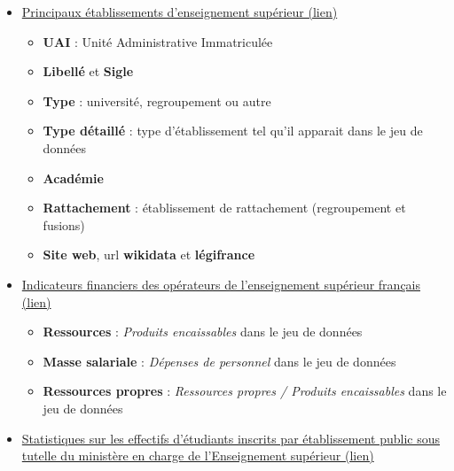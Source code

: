 \documentclass[12pt,french,]{article}
\providecommand{\tightlist}{%
  \setlength{\itemsep}{0pt}\setlength{\parskip}{0pt}}
\begin{document}
\begin{itemize}
\tightlist
\item
  \href{https://data.enseignementsup-recherche.gouv.fr/explore/dataset/fr-esr-principaux-etablissements-enseignement-superieur/}{Principaux
  établissements d'enseignement supérieur (lien)}

  \begin{itemize}
  \tightlist
  \item
    \textbf{UAI} : Unité Administrative Immatriculée
  \item
    \textbf{Libellé} et \textbf{Sigle}
  \item
    \textbf{Type} : université, regroupement ou autre
  \item
    \textbf{Type détaillé} : type d'établissement tel qu'il apparait
    dans le jeu de données
  \item
    \textbf{Académie}
  \item
    \textbf{Rattachement} : établissement de rattachement (regroupement
    et fusions)
  \item
    \textbf{Site web}, url \textbf{wikidata} et \textbf{légifrance}
  \end{itemize}
\item
  \href{https://data.enseignementsup-recherche.gouv.fr/explore/dataset/fr-esr-operateurs-indicateurs-financiers/}{Indicateurs
  financiers des opérateurs de l'enseignement supérieur français (lien)}

  \begin{itemize}
  \tightlist
  \item
    \textbf{Ressources} : \emph{Produits encaissables} dans le jeu de
    données
  \item
    \textbf{Masse salariale} : \emph{Dépenses de personnel} dans le jeu
    de données
  \item
    \textbf{Ressources propres} : \emph{Ressources propres / Produits
    encaissables} dans le jeu de données
  \end{itemize}
\item
  \href{https://data.enseignementsup-recherche.gouv.fr/explore/dataset/fr-esr-statistiques-sur-les-effectifs-d-etudiants-inscrits-par-etablissement/}{Statistiques
  sur les effectifs d'étudiants inscrits par établissement public sous
  tutelle du ministère en charge de l'Enseignement supérieur (lien)}


\end{itemize}
\end{document}
